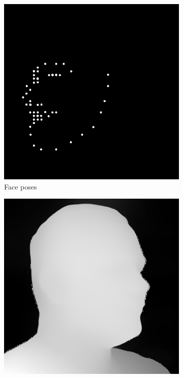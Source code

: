 \begin{figure}[ht]
\begin{subfigure}{0.18\linewidth}
        \includegraphics[width=\textwidth]{Figures/failed/controlnet/openpose/0-C-5-1-5386_212530_574_openpose.png}
        \caption{Face poses}
	\end{subfigure}
    \begin{subfigure}{0.18\linewidth}
        \includegraphics[width=\textwidth]{Figures/failed/controlnet/depth/0-4-5-1-5648_230239_266_depth.png}

\end{subfigure}
\end{figure}
